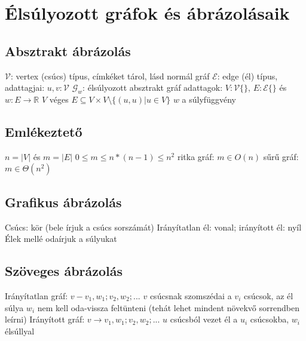 \documentclass[12pt,a4paper]{article}
\begin{document}
\pagebreak

\section{Élsúlyozott gráfok és ábrázolásaik}

\subsection{Absztrakt ábrázolás}

\begin{outline}
	\1 $\mathcal{V}$: vertex (csúcs) típus, címkéket tárol, lásd normál gráf
	\1 $\mathcal{E}$: edge (él) típus, adattagjai: $u,v : \mathcal{V}$
	\1 $\mathcal{G}_w$: élsúlyozott absztrakt gráf
		\2 adattagok: $V:\mathcal{V}\{\}$, $E:\mathcal{E}\{\}$ és $w:E \to \mathbb{R}$
		\2 $V$ véges
		\2 $E \subseteq V \times V \setminus \{(u,u) | u \in V\}$
		\2 $w$ a súlyfüggvény
\end{outline}

\subsection{Emlékeztető}

\begin{outline}
	\1 $n=|V|$ és $m=|E|$
	\1 $0 \le m \le n*(n-1) \le n^2$
	\1 ritka gráf: $m \in O(n)$
	\1 sűrű gráf: $m \in \Theta(n^2)$
\end{outline}

\subsection{Grafikus ábrázolás}

\begin{outline}
	\1 Csúcs: kör (bele írjuk a csúcs sorszámát)
	\1 Irányítatlan él: vonal; irányított él: nyíl
	\1 Élek mellé odaírjuk a súlyukat
\end{outline}

\subsection{Szöveges ábrázolás}

\begin{outline}
	\1 Irányítatlan gráf: $v - v_1, w_1 ; v_2, w_2 ; ...$
		\2 $v$ csúcsnak szomszédai a $v_i$ csúcsok, az él súlya $w_i$
		\2 nem kell oda-vissza feltünteni (tehát lehet mindent növekvő sorrendben leírni)
	\1 Irányított gráf: $v \to v_1, w_1 ; v_2, w_2 ; ...$
		\2 $u$ csúcsból vezet él a $u_i$ csúcsokba, $w_i$ élsúllyal
\end{outline}
\end{document}
